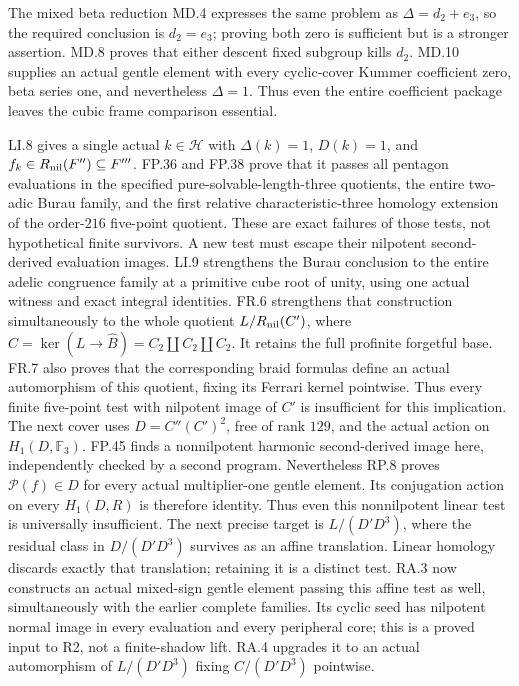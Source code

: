 The mixed beta reduction MD.4 expresses the same problem as
$\Delta=d_2+e_3$, so the required conclusion is $d_2=e_3$;
proving both zero is sufficient but is a stronger assertion.
MD.8 proves that either descent fixed subgroup kills $d_2$.
MD.10 supplies an actual gentle element with every cyclic-cover
Kummer coefficient zero, beta series one, and nevertheless
$\Delta=1$. Thus even the entire coefficient package leaves
the cubic frame comparison essential.

LI.8 gives a single actual $k\in\mathcal H$ with
$\Delta(k)=1$, $D(k)=1$, and
$f_k\in R_{\rm nil}(F'')\subseteq F'''$.
FP.36 and FP.38 prove that it passes all pentagon evaluations
in the specified pure-solvable-length-three quotients, the
entire two-adic Burau family, and the first relative
characteristic-three homology extension of the order-$216$
five-point quotient. These are exact failures of those tests,
not hypothetical finite survivors. A new test must escape
their nilpotent second-derived evaluation images.
LI.9 strengthens the Burau conclusion to the entire adelic
congruence family at a primitive cube root of unity, using
one actual witness and exact integral identities.
FR.6 strengthens that construction simultaneously to the
whole quotient $L/R_{\rm nil}(C')$, where
$C=\ker(L\to\widehat B)=C_2\amalg C_2\amalg C_2$.
It retains the full profinite forgetful base. FR.7 also proves
that the corresponding braid formulas define an actual
automorphism of this quotient, fixing its Ferrari kernel
pointwise. Thus every finite five-point test with nilpotent
image of $C'$ is insufficient for this implication.
The next cover uses $D=C''(C')^2$, free of rank $129$, and
the actual action on $H_1(D,\mathbb F_3)$. FP.45 finds a
nonnilpotent harmonic second-derived image here, independently
checked by a second program. Nevertheless RP.8 proves
$\mathcal P(f)\in D$ for every actual multiplier-one gentle
element. Its conjugation action on every $H_1(D,R)$ is
therefore identity. Thus even this nonnilpotent linear test
is universally insufficient. The next precise target is
$L/(D'D^3)$, where the residual class in $D/(D'D^3)$
survives as an affine translation. Linear homology discards
exactly that translation; retaining it is a distinct test.
RA.3 now constructs an actual mixed-sign gentle element
passing this affine test as well, simultaneously with the
earlier complete families. Its cyclic seed has nilpotent
normal image in every evaluation and every peripheral core;
this is a proved input to R2, not a finite-shadow lift.
RA.4 upgrades it to an actual automorphism of
$L/(D'D^3)$ fixing $C/(D'D^3)$ pointwise.

